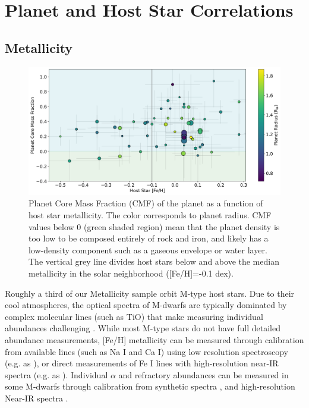 \documentclass[twocolumn]{aastex631}
\begin{document}
\section{Planet and Host Star Correlations}
\label{sec:Correlations}
\subsection{Metallicity}
 \begin{figure}
    \centering
    \includegraphics[width=1.0\textwidth]{Metallicity.png}
   
    \caption{Planet Core Mass Fraction (CMF) of the planet as a function of host star metallicity. The color corresponds to planet radius. CMF values below 0 (green shaded region) mean that the planet density is too low to be composed entirely of rock and iron, and likely has a low-density component such as a gaseous envelope or water layer. The vertical grey line divides host stars below and above the median metallicity in the solar neighborhood ([Fe/H]=-0.1 dex).}
    \label{fig:metallicity}
\end{figure}

%

Roughly a third of our Metallicity sample orbit M-type host stars. Due to their cool atmospheres, the optical spectra of M-dwarfs are typically dominated by complex molecular lines (such as TiO) that make measuring individual abundances challenging \citep{2022ApJ...927..123S}. While most M-type stars do not have full detailed abundance measurements, [Fe/H] metallicity can be measured through calibration from available lines (such as Na I and Ca I) using low resolution spectroscopy (e.g. as \cite{2012ApJ...748...93R}), or direct measurements of Fe I lines with high-resolution near-IR spectra (e.g. as \cite{2012A&A...542A..33O}). Individual $\alpha$ and refractory abundances can be measured in some M-dwarfs through calibration from synthetic spectra \citep[e.g..][]{2017ApJ...851...26V, 2023ApJ...944...41I}, and high-resolution Near-IR spectra \citep{2022ApJ...927..123S}. 
\end{document}
